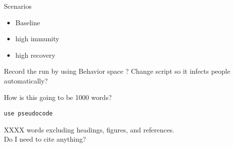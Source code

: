 \documentclass[11pt]{article} %
\begin{document}
Scenarios
\begin{itemize}
\item Baseline 
\item high immunity
\item high recovery
\end{itemize}

Record the run by using Behavior space ?
Change script so it infects people automatically?

How is this going to be 1000 words? 



\begin{verbatim}
use pseudocode
\end{verbatim}

XXXX words excluding headings, figures, and references. \\

Do I need to cite anything? 

\nocite{*}


\printbibliography
\end{document}
